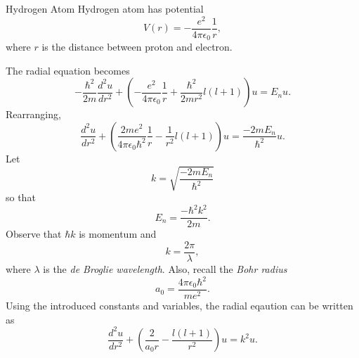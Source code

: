 \documentclass[phys334]{subfiles}
\begin{document}
    \begin{example}{Hydrogen Atom}
        Hydrogen atom has potential
        \begin{equation*}
            V\left( r \right) = -\frac{e^{2}}{4\pi\epsilon_0} \frac{1}{r},
        \end{equation*}
        where $r$ is the distance between proton and electron.

        The radial equation becomes
        \begin{equation*}
            -\frac{\hbar^{2}}{2m} \frac{d^{2}u}{dr^{2}} + \left( -\frac{e^{2}}{4\pi\epsilon_0} \frac{1}{r} + \frac{\hbar^{2}}{2mr^{2}}l\left( l+1 \right) \right) u = E_nu.
        \end{equation*}
        Rearranging,
        \begin{equation*}
            \frac{d^{2}u}{dr^{2}} + \left( \frac{2me^{2}}{4\pi\epsilon_0\hbar^{2}} \frac{1}{r} - \frac{1}{r^{2}} l\left( l+1 \right) \right) u = \frac{-2mE_n}{\hbar^{2}} u.
        \end{equation*}
        Let
        \begin{equation*}
            k = \sqrt{\frac{-2mE_n}{\hbar^{2}}}
        \end{equation*}
        so that
        \begin{equation*}
            E_n = \frac{-\hbar^{2}k^{2}}{2m}.
        \end{equation*}
        Observe that $\hbar k$ is momentum and
        \begin{equation*}
            k = \frac{2\pi}{\lambda},
        \end{equation*}
        where $\lambda$ is the \textit{de Broglie wavelength}. Also, recall the \textit{Bohr radius}
        \begin{equation*}
            a_0 = \frac{4\pi\epsilon_0\hbar^{2}}{me^{2}}.
        \end{equation*}
        Using the introduced constants and variables, the radial eqaution can be written as
        \begin{equation}
            \frac{d^{2}u}{dr^{2}} + \left( \frac{2}{a_0r}-\frac{l\left( l+1 \right)}{r^{2}} \right) u = k^{2}u.
        \end{equation}


\end{example}
\end{document}
